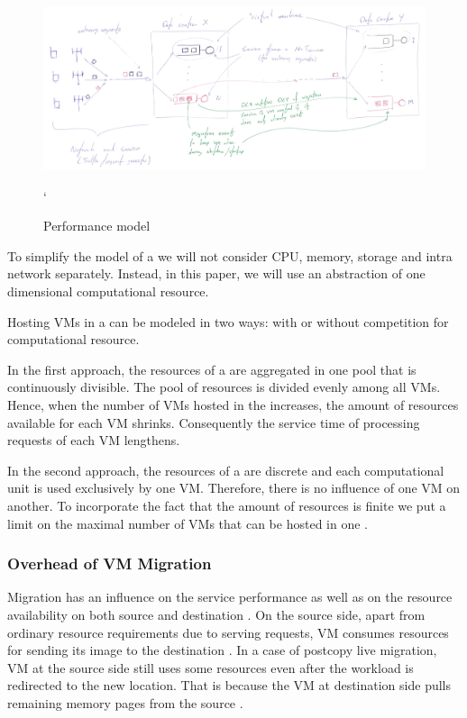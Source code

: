 \subsection{\Dc}
\begin{figure}[tb]
	\centering
	\includegraphics[width=\linewidth]{dc_model.jpg} 
	\caption{Performance model}
	\label{fig:performance_model}`
\end{figure}

To simplify the model of a \dc{} we will not consider CPU, memory, storage and intra \dc network separately.
Instead, in this paper, we will use an abstraction of one dimensional computational resource.

Hosting VMs in a \dc{} can be modeled in two ways: with or without competition for computational resource.

In the first approach, the resources of a \dc{} are aggregated in one pool that is continuously divisible.
The pool of resources is divided evenly among all VMs.
Hence, when the number of VMs hosted in the \dc{} increases, the amount of resources available for each VM shrinks.
Consequently the service time of processing requests of each VM lengthens.

In the second approach, the resources of a \dc{} are discrete and each computational unit is used exclusively by one VM.
Therefore, there is no influence of one VM on another.
To incorporate the fact that the amount of resources is finite we put a limit on the maximal number of VMs that can be hosted in one \dc{}.

\subsubsection{Overhead of VM Migration}
Migration has an influence on the service performance as well as on the resource availability on both source and destination \dc{}.
On the source side, apart from ordinary resource requirements due to serving requests, VM consumes resources for sending its image to the destination \dc{}.
In a case of postcopy live migration, VM at the source side still uses some resources even after the workload is redirected to the new location.
That is because the VM at destination side pulls remaining memory pages from the source \dc{}.

